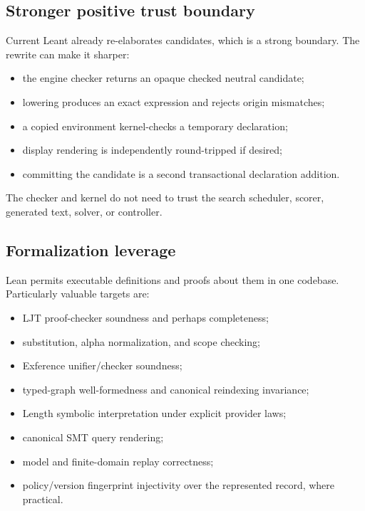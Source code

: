 \documentclass[10pt,letterpaper,oneside]{report}
\begin{document}
\subsection{Stronger positive trust boundary}

Current Leant already re-elaborates candidates, which is a strong boundary. The rewrite can make it sharper:

\begin{itemize}
  \item the engine checker returns an opaque checked neutral candidate;
  \item lowering produces an exact expression and rejects origin mismatches;
  \item a copied environment kernel-checks a temporary declaration;
  \item display rendering is independently round-tripped if desired;
  \item committing the candidate is a second transactional declaration addition.
\end{itemize}

The checker and kernel do not need to trust the search scheduler, scorer, generated text, solver, or controller.

\subsection{Formalization leverage}

Lean permits executable definitions and proofs about them in one codebase. Particularly valuable targets are:

\begin{itemize}
  \item LJT proof-checker soundness and perhaps completeness;
  \item substitution, alpha normalization, and scope checking;
  \item Exference unifier/checker soundness;
  \item typed-graph well-formedness and canonical reindexing invariance;
  \item Length symbolic interpretation under explicit provider laws;
  \item canonical SMT query rendering;
  \item model and finite-domain replay correctness;
  \item policy/version fingerprint injectivity over the represented record, where practical.
\end{itemize}
\end{document}
